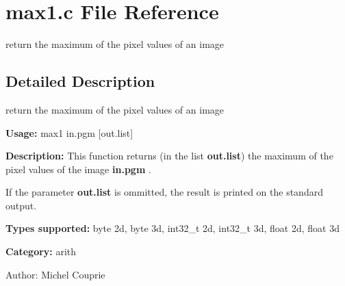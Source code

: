 \section{max1.c File Reference}
\label{max1_8c}
return the maximum of the pixel values of an image 



\subsection{Detailed Description}
return the maximum of the pixel values of an image 

{\bf Usage:} max1 in.pgm [out.list]

{\bf Description:} This function returns (in the list {\bf out.list}) the maximum of the pixel values of the image {\bf in.pgm} .

If the parameter {\bf out.list} is ommitted, the result is printed on the standard output.

{\bf Types supported:} byte 2d, byte 3d, int32\_\-t 2d, int32\_\-t 3d, float 2d, float 3d

{\bf Category:} arith

\begin{Desc}
\item[Author:]Michel Couprie \end{Desc}
